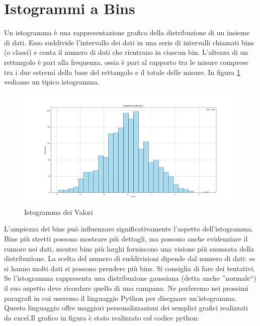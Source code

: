 \documentclass{article}
\begin{document}
\section{Istogrammi a Bins}
Un istogramma è una rappresentazione grafica della distribuzione di un insieme di dati. Esso suddivide l'intervallo dei dati in una serie di intervalli chiamati bins (o classi) e conta il numero di dati che rientrano in ciascun bin. L'altezza di un rettangolo è pari alla frequenza, ossia è pari al rapporto tra le misure  comprese tra i due estremi della base del rettangolo  e il totale delle misure.  In figura \ref{fig:istogrammagenerico} vediamo un tipico istogramma.

\begin{figure}[h!]
    \centering
    \includegraphics[width=\linewidth]{istogrammagenerico.png}
    \caption{Istogramma dei Valori}
    \label{fig:istogrammagenerico}
\end{figure}


 
L'ampiezza dei bins può influenzare significativamente l'aspetto dell'istogramma. Bins più stretti possono mostrare più dettagli, ma possono anche evidenziare il rumore nei dati, mentre bins più larghi forniscono una visione più smussata della distribuzione. La scelta del numero di suddivisioni dipende dal numero di dati: se si hanno molti dati si possono prendere più bins. Si consiglia di fare dei tentativi. Se l'istogramma rappresenta una distribuzione gaussiana  (detta anche ''normale``) il suo aspetto deve ricordare quello di una campana. Ne parleremo nei prossimi paragrafi in cui useremo il linguaggio Python per disegnare un'istogramma. Questo linguaggio offre maggiori personalizzazioni dei semplici grafici realizzati da excel.Il grafico in figura è stato realizzato col codice python:
\end{document}
